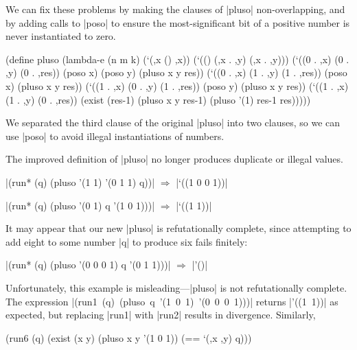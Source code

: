 We can fix these problems by making the clauses of \scheme|pluso|
non-overlapping, and by adding calls to \scheme|poso| to ensure the
most-significant bit of a positive number is never instantiated to
zero.

\newpage

\begin{schemedisplay}
(define pluso
  (lambda-e (n m k)
    (`(,x () ,x))
    (`(() (,x . ,y) (,x . ,y)))
    (`((0 . ,x) (0 . ,y) (0 . ,res)) (poso x) (poso y)
     (pluso x y res))
    (`((0 . ,x) (1 . ,y) (1 . ,res)) (poso x)
     (pluso x y res))
    (`((1 . ,x) (0 . ,y) (1 . ,res)) (poso y)
     (pluso x y res))
    (`((1 . ,x) (1 . ,y) (0 . ,res))
     (exist (res-1)
       (pluso x y res-1)
       (pluso '(1) res-1 res)))))
\end{schemedisplay}

\enlargethispage{1em}

\noindent We separated the third clause of the original \scheme|pluso|
into two clauses, so we can use \scheme|poso| to avoid illegal
instantiations of numbers.

The improved definition of \scheme|pluso| no longer produces duplicate
or illegal values.

\wspace

\noindent\scheme|(run* (q) (pluso '(1 1) '(0 1 1) q))| $\Rightarrow$ \scheme|`((1 0 0 1))|

\noindent\scheme|(run* (q) (pluso '(0 1) q '(1 0 1)))| $\Rightarrow$ \scheme|`((1 1))|

\wspace

It may appear that our new \scheme|pluso| is refutationally complete,
since attempting to add eight to some number \scheme|q| to produce six
fails finitely:

\wspace

\noindent\scheme|(run* (q) (pluso '(0 0 0 1) q '(0 1 1)))| $\Rightarrow$ \scheme|'()|

\wspace

\noindent Unfortunately, this example is misleading---\scheme|pluso|
is not refutationally complete.  The expression
\mbox{\scheme|(run1 (q) (pluso q '(1 0 1) '(0 0 0 1)))|} 
returns \mbox{\scheme|'((1 1))|} as expected, but replacing
\scheme|run1| with \scheme|run2| results in divergence.  Similarly,

\schemedisplayspace
\begin{schemedisplay}
(run6 (q)
  (exist (x y)
    (pluso x y '(1 0 1))
    (== `(,x ,y) q)))
\end{schemedisplay}

